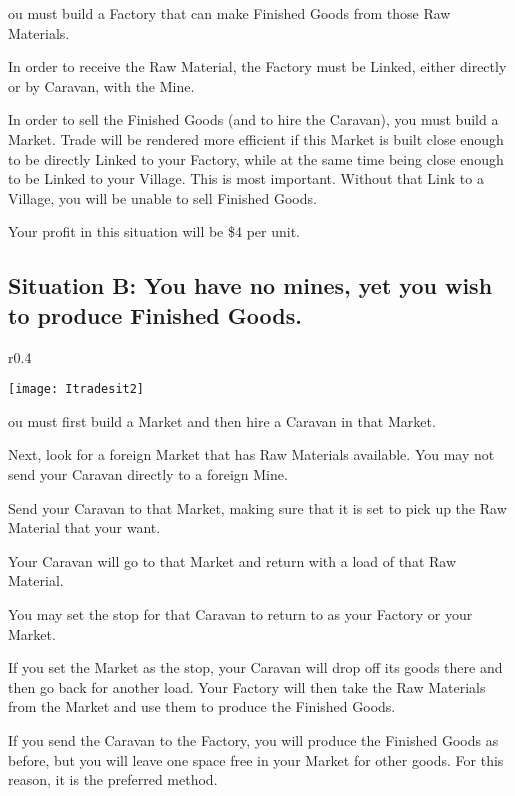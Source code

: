 ou must build a Factory that can make Finished Goods from those Raw Materials.

In order to receive the Raw Material, the Factory must be Linked, either directly or by Caravan, with the Mine.

In order to sell the Finished Goods (and to hire the Caravan), you must build a Market. Trade will be rendered more efficient if this Market is built close enough to be directly Linked to your Factory, while at the same time being close enough to be Linked to your Village. This is most important. Without that Link to a Village, you will be unable to sell Finished Goods.

Your profit in this situation will be \$4 per unit.

\subsection{\textsf{Situation B: You have no mines, yet you wish to produce Finished Goods.}}

\begin{wrapfigure}{r}{0.4\textwidth}
    \vspace{-20pt}
    \begin{center}
        \texttt{[image: Itradesit2]} %
    \end{center}
    \vspace{-20pt}
\end{wrapfigure}

ou must first build a Market and then hire a Caravan in that Market.

Next, look for a foreign Market that has Raw Materials available. You may not send your Caravan directly to a foreign Mine.

Send your Caravan to that Market, making sure that it is set to pick up the Raw Material that your want.

Your Caravan will go to that Market and return with a load of that Raw Material.

You may set the stop for that Caravan to return to as your Factory or your Market.

If you set the Market as the stop, your Caravan will drop off its goods there and then go back for another load. Your Factory will then take the Raw Materials from the Market and use them to produce the Finished Goods.

If you send the Caravan to the Factory, you will produce the Finished Goods as before, but you will leave one space free in your Market for other goods. For this reason, it is the preferred method.

